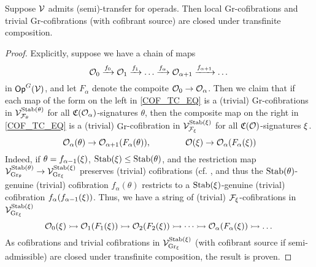 \documentclass[a4paper,10pt
]{article}%
\renewcommand{\F}{\mathcal F}
\renewcommand{\1}{\ensuremath{\mathbb{id}}}
\begin{document}
\begin{lemma}
      \label{COF_TC_LEM}
      Suppose $\mathcal V$ admits (semi)-transfer for operads.
      Then local $\mathrm{Gr}$-cofibrations and  trivial $\mathrm{Gr}$-cofibrations (with cofibrant source) are closed under transfinite composition.
\end{lemma}
\begin{proof}
      Explicitly, suppose we have a chain of maps
      \begin{equation}
            \mathcal{O}_0 \xrightarrow{f_0} \mathcal{O}_1 \xrightarrow{f_1} \dots \xrightarrow{f_\alpha} \mathcal{O}_{\alpha+1} \xrightarrow{f_{\alpha+1}} \dots
      \end{equation}
      in $\mathsf{Op}^G(\mathcal V)$, and let $F_\alpha$ denote the compoite $\mathcal{O}_0 \to \mathcal{O}_\alpha$.
      Then we claim that
      if each map of the form on the left in \eqref{COF_TC_EQ}
      is a (trivial) $\mathrm{Gr}$-cofibrations in $\V^{\Stab(\theta)}_{\F_\theta}$
      for all $\mathfrak C(\mathcal{O}_\alpha)$-signatures $\theta$, then
      the composite map on the right in \eqref{COF_TC_EQ}
      is a (trivial) $\mathrm{Gr}$-cofibration in $\V^{\Stab(\ksi)}_{\F_\ksi}$
      for all $\mathfrak C(\mathcal{O})$-signatures $\xi$.     
       \begin{equation}
            \label{COF_TC_EQ}
            \mathcal{O}_\alpha(\theta) \to \mathcal{O}_{\alpha+1}(F_\alpha(\theta)),
            \qquad  \qquad
            \mathcal{O}(\xi) \to \mathcal{O}_\alpha(F_\alpha(\xi))
      \end{equation}
      Indeed, if $\theta = f_{\alpha-1}(\xi)$,
      $\mathrm{Stab}(\xi) \leq \mathrm{Stab}(\theta)$,
      and the restriction map $\mathcal V^{\mathrm{Stab}(\theta)}_{\mathrm{Gr}_\theta} \to \mathcal V^{\mathrm{Stab}(\xi)}_{\mathrm{Gr}_\xi}$
      preserves (trivial) cofibrations (cf. \cite[Prop 6.6]{BP17},
      and thus the $\mathrm{Stab}(\theta)$-genuine (trivial) cofibration $f_\alpha(\theta)$ 
      restricts to a $\mathrm{Stab}(\xi)$-genuine (trivial) cofibration $f_\alpha(f_{\alpha-1}(\xi))$.
      Thus, we have a string of (trivial) $\F_\ksi$-cofibrations in $\mathcal V^{\mathrm{Stab}(\xi)}_{\mathrm{Gr}_\xi}$
      \begin{equation}
            \mathcal{O}_0(\xi) \rightarrowtail \mathcal{O}_1(F_1(\xi)) \rightarrowtail \mathcal{O}_2(F_2(\xi)) \rightarrowtail \dots
            \rightarrowtail \mathcal{O}_\alpha(F_\alpha(\xi)) \rightarrowtail \dots
      \end{equation}
      As cofibrations and trivial cofibrations in $\mathcal V^{\mathrm{Stab}(\xi)}_{\mathrm{Gr}_\xi}$ (with cofibrant source if semi-admissible)
      are closed under transfinite composition, the result is proven.
\end{proof}
\end{document}
